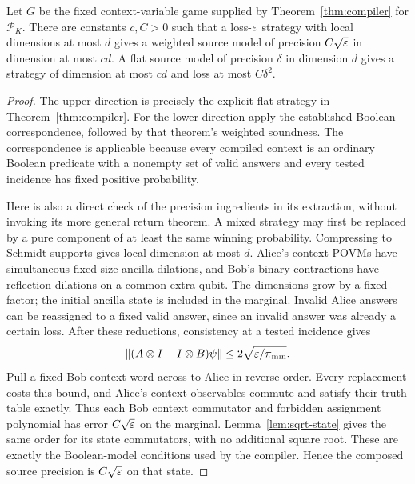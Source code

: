 \begin{proposition}\label{prop:game-transfer}
Let $G$ be the fixed context-variable game supplied by Theorem~\ref{thm:compiler} for $\mathcal P_K$. There are constants $c,C>0$ such that a loss-$\varepsilon$ strategy with local dimensions at most $d$ gives a weighted source model of precision $C\sqrt{\varepsilon}$ in dimension at most $cd$. A flat source model of precision $\delta$ in dimension $d$ gives a strategy of dimension at most $cd$ and loss at most $C\delta^2$.
\end{proposition}
\begin{proof}
The upper direction is precisely the explicit flat strategy in Theorem~\ref{thm:compiler}. For the lower direction apply the established Boolean correspondence, followed by that theorem's weighted soundness. The correspondence is applicable because every compiled context is an ordinary Boolean predicate with a nonempty set of valid answers and every tested incidence has fixed positive probability.

Here is also a direct check of the precision ingredients in its extraction, without invoking its more general return theorem. A mixed strategy may first be replaced by a pure component of at least the same winning probability. Compressing to Schmidt supports gives local dimension at most $d$. Alice's context POVMs have simultaneous fixed-size ancilla dilations, and Bob's binary contractions have reflection dilations on a common extra qubit. The dimensions grow by a fixed factor; the initial ancilla state is included in the marginal. Invalid Alice answers can be reassigned to a fixed valid answer, since an invalid answer was already a certain loss. After these reductions, consistency at a tested incidence gives
\[
 \|(A\otimes I-I\otimes B)\psi\|\le2\sqrt{\varepsilon/\pi_{\min}}.
\]
Pull a fixed Bob context word across to Alice in reverse order. Every replacement costs this bound, and Alice's context observables commute and satisfy their truth table exactly. Thus each Bob context commutator and forbidden assignment polynomial has error $C\sqrt{\varepsilon}$ on the marginal. Lemma~\ref{lem:sqrt-state} gives the same order for its state commutators, with no additional square root. These are exactly the Boolean-model conditions used by the compiler. Hence the composed source precision is $C\sqrt{\varepsilon}$ on that state.
\end{proof}

